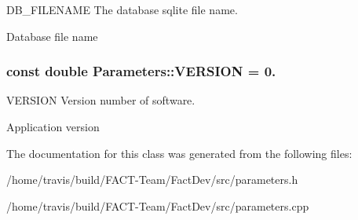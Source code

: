 D\-B\-\_\-\-F\-I\-L\-E\-N\-A\-M\-E The database sqlite file name. 

Database file name \hypertarget{classParameters_a279ee24140c761de46178daa8960bdc8}{
\subsubsection[{V\-E\-R\-S\-I\-O\-N}]{\setlength{\rightskip}{0pt plus 5cm}const double Parameters\-::\-V\-E\-R\-S\-I\-O\-N = 0.\hspace{0.3cm}{\ttfamily [static]}}}\label{classParameters_a279ee24140c761de46178daa8960bdc8}


V\-E\-R\-S\-I\-O\-N Version number of software. 

Application version 

The documentation for this class was generated from the following files\-:\begin{DoxyCompactItemize}
\item 
/home/travis/build/\-F\-A\-C\-T-\/\-Team/\-Fact\-Dev/src/parameters.\-h\item 
/home/travis/build/\-F\-A\-C\-T-\/\-Team/\-Fact\-Dev/src/parameters.\-cpp\end{DoxyCompactItemize}
